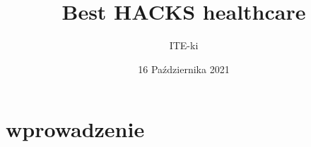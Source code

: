 \documentclass{article}
\title{Best HACKS healthcare}
\author{ITE-ki}
\date{16 Października 2021}
\begin{document}
\maketitle

\section{wprowadzenie}

\section{}
\end{document}
